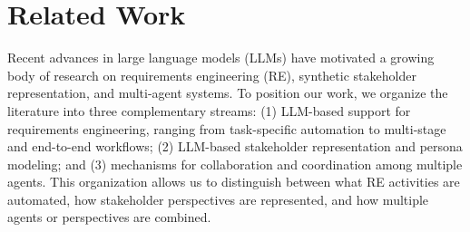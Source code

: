 \section{Related Work}
\label{sec:related-work}

Recent advances in large language models (LLMs) have motivated a growing body of research on requirements engineering (RE), synthetic stakeholder representation, and multi-agent systems. To position our work, we organize the literature into three complementary streams: (1) LLM-based support for requirements engineering, ranging from task-specific automation to multi-stage and end-to-end workflows; (2) LLM-based stakeholder representation and persona modeling; and (3) mechanisms for collaboration and coordination among multiple agents. This organization allows us to distinguish between what RE activities are automated, how stakeholder perspectives are represented, and how multiple agents or perspectives are combined.





